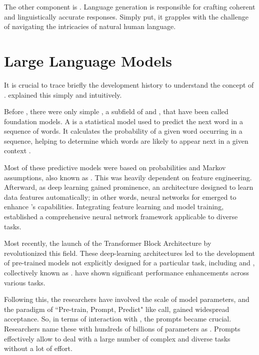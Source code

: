 The other component is \textbf{{\nlg}}. Language generation is responsible for crafting coherent and linguistically accurate responses. Simply put, it grapples with the challenge of navigating the intricacies of natural human language. 



\section{Large Language Models}

It is crucial to trace briefly the development history to understand the concept of {\llm}. \citet{liu_prompting_nodate} explained this simply and intuitively.

Before {\llm}, there were only simple {\lm}, a subfield of {\nlp} and {\ai}, that have been called foundation models. A {\lm} is a statistical model used to predict the next word in a sequence of words. It calculates the probability of a given word occurring in a sequence, helping to determine which words are likely to appear next in a given context \cite{chang_language_2023}.

Most of these predictive models were based on probabilities and Markov assumptions, also known as {\slm}. This was heavily dependent on feature engineering. Afterward, as deep learning gained prominence, an architecture designed to learn data features automatically; in other words, neural networks for {\nlp} emerged to enhance {\lm}’s capabilities. Integrating feature learning and model training, {\nlm} established a comprehensive neural network framework applicable to diverse {\nlp} tasks.

Most recently, the launch of the Transformer Block Architecture by \citet{vaswani_attention_2023} revolutionized this field. These deep-learning architectures led to the development of pre-trained models not explicitly designed for a particular task, including {\bert} and {\gpt}, collectively known as {\plm}. {\plm} have shown significant performance enhancements across various {\nlp} tasks.

Following this, the researchers have involved the scale of model parameters, and the paradigm of “Pre-train, Prompt, Predict" like \citet{liu_prompting_nodate} call, gained widespread acceptance. So, in terms of interaction with {\lm}, the prompts became crucial. Researchers name these {\plm} with hundreds of billions of parameters as {\llm}. Prompts effectively allow {\llm} to deal with a large number of complex and diverse tasks without a lot of effort.

